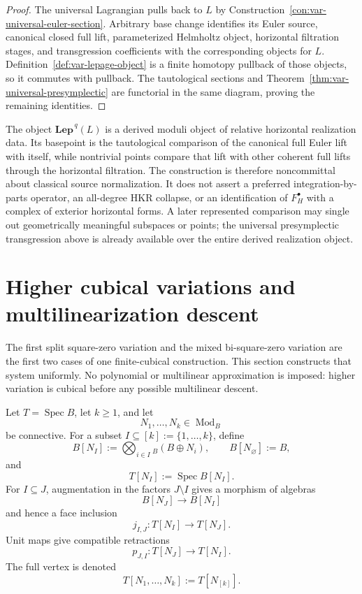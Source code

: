 \begin{proof}
The universal Lagrangian pulls back to \(L\) by Construction~\ref{con:var-universal-euler-section}.  Arbitrary base change identifies its Euler source, canonical closed full lift, parameterized Helmholtz object, horizontal filtration stages, and transgression coefficients with the corresponding objects for \(L\).  Definition~\ref{def:var-lepage-object} is a finite homotopy pullback of those objects, so it commutes with pullback.  The tautological sections and Theorem~\ref{thm:var-universal-presymplectic} are functorial in the same diagram, proving the remaining identities.
\end{proof}

\begin{remark}
\label{rem:var-lepage-scope}
The object \(\mathbf{Lep}^{\,q}(L)\) is a derived moduli object of relative horizontal realization data.  Its basepoint is the tautological comparison of the canonical full Euler lift with itself, while nontrivial points compare that lift with other coherent full lifts through the horizontal filtration.  The construction is therefore noncommittal about classical source normalization.  It does not assert a preferred integration-by-parts operator, an all-degree HKR collapse, or an identification of \(F_H^\bullet\) with a complex of exterior horizontal forms.  A later represented comparison may single out geometrically meaningful subspaces or points; the universal presymplectic transgression above is already available over the entire derived realization object.
\end{remark}


\section{Higher cubical variations and multilinearization descent}
\label{sec:var-second-variation}
\label{sec:var-higher-variations}

The first split square-zero variation and the mixed bi-square-zero variation are the first two cases of one finite-cubical construction. This section constructs that system uniformly. No polynomial or multilinear approximation is imposed: higher variation is cubical before any possible multilinear descent.

\begin{definition}
\label{def:var-k-cube-test}
Let \(T=\operatorname{Spec}B\), let \(k\ge1\), and let
\[
    N_1,\ldots,N_k\in\operatorname{Mod}_B
\]
be connective. For a subset \(I\subseteq[k]:=\{1,\ldots,k\}\), define
\[
    B[N_I]
    :=
    \bigotimes_{i\in I}{}_B(B\oplus N_i),
    \qquad
    B[N_\varnothing]:=B,
\]
and
\[
    T[N_I]:=\operatorname{Spec}B[N_I].
\]
For \(I\subseteq J\), augmentation in the factors \(J\setminus I\) gives a morphism of algebras
\[
    B[N_J]\longrightarrow B[N_I]
\]
and hence a face inclusion
\[
    j_{I,J}:T[N_I]\longrightarrow T[N_J].
\]
Unit maps give compatible retractions
\[
    p_{J,I}:T[N_J]\longrightarrow T[N_I].
\]
The full vertex is denoted
\[
    T[N_1,\ldots,N_k]:=T[N_{[k]}].
\]
\end{definition}

